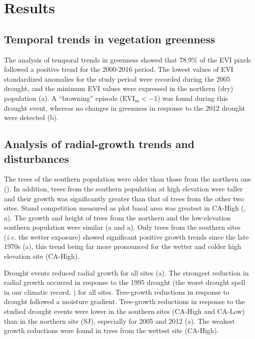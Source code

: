 \section{Results}\label{sec:dendro:Results}
\subsection{Temporal trends in vegetation greenness}\label{sec:dendro:ResultsEVI}

The analysis of temporal trends in greenness showed that 78.9\% of the EVI pixels followed a positive trend for the 2000-2016 period. The lowest values of EVI standardized anomalies for the study period were recorded during the 2005 drought, and the minimum EVI values were expressed in the northern (dry) population (a). A ``browning'' episode (\(\mathrm{EVI_{sa}} < -1\)) was found during this drought event, whereas no changes in greenness in response to the 2012 drought were detected (b).

\subsection{Analysis of radial-growth trends and disturbances}\label{sec:dendro:ResultsBAI}
The trees of the southern population were older than those from the northern one (). In addition, trees from the southern population at high elevation were taller and their growth was significantly greater than that of trees from the other two sites. Stand competition measured as plot basal area was greatest in CA-High (, a). The growth and height of trees from the northern and the low-elevation southern population were similar (a and a). Only trees from the southern sites (\emph{i.e.} the wetter exposure) showed significant positive growth trends since the late 1970s (a), this trend being far more pronounced for the wetter and colder high elevation site (CA-High).

Drought events reduced radial growth for all sites (a). The strongest reduction in radial growth occurred in response to the 1995 drought (the worst drought spell in our climatic record, ) for all sites. Tree-growth reductions in response to drought followed a moisture gradient. Tree-growth reductions in response to the studied drought events were lower in the southern sites (CA-High and CA-Low) than in the northern site (SJ), especially for 2005 and 2012 (a). The weakest growth reductions were found in trees from the wettest site (CA-High).

